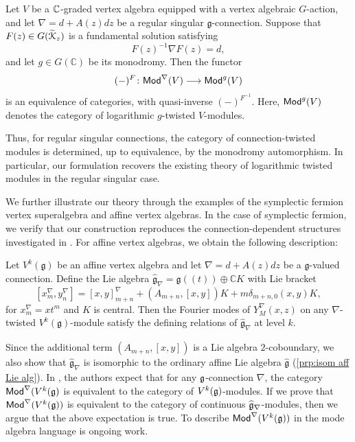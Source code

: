 \documentclass[final,reqno]{amsart}
\begin{document}
\begin{mainthm}
    Let $V$ be a $\mathbb{C}$-graded vertex algebra equipped with a vertex algebraic $G$-action, and let $\nabla=d+A(z)dz$ be a regular singular $\mathfrak{g}$-connection. Suppose that $F(z)\in G(\widetilde{\EuScript{K}}_z)$ is a fundamental solution satisfying
    \[
        F(z)^{-1}\nabla F(z)=d,
    \]
    and let $g\in G(\mathbb{C})$ be its monodromy. Then the functor
    \[
        (-)^F\colon\mathsf{Mod}^\nabla(V)\longrightarrow\mathsf{Mod}^g(V)
    \]
    is an equivalence of categories, with quasi-inverse $(-)^{F^{-1}}$. Here, $\mathsf{Mod}^g(V)$ denotes the category of logarithmic $g$-twisted $V$-modules.
\end{mainthm}
Thus, for regular singular connections, the category of connection-twisted modules is determined, up to equivalence, by the monodromy automorphism. In particular, our formulation recovers the existing theory of logarithmic twisted modules in the regular singular case.

We further illustrate our theory through the examples of the symplectic fermion vertex superalgebra and affine vertex algebras. In the case of symplectic fermion, we verify that our construction reproduces the connection-dependent structures investigated in \cite{FL25}. For affine vertex algebras, we obtain the following description:
\begin{mainthm}
    Let $V^k(\mathfrak{g})$ be an affine vertex algebra and let $\nabla=d+A(z)dz$ be a $\mathfrak{g}$-valued connection. Define the Lie algebra $\widehat{\mathfrak g}_\nabla=\mathfrak g((t))\oplus\mathbb CK$ with Lie bracket
\[
    [x_m^\nabla,y_n^\nabla]
    =[x,y]_{m+n}^\nabla
    +(A_{m+n},[x,y])K
    +m\delta_{m+n,0}(x,y)K,
\]
for $x_m^\nabla=xt^m$ and $K$ is central. Then the Fourier modes of $Y_M^\nabla(x,z)$ on any $\nabla$-twisted $V^k(\mathfrak{g})$-module satisfy the defining relations of $\widehat{\mathfrak g}_\nabla$ at level $k$.
\end{mainthm}

Since the additional term $(A_{m+n},[x,y])$ is a Lie algebra $2$-coboundary, we also show that $\widehat{\mathfrak g}_\nabla$ is isomorphic to the ordinary affine Lie algebra $\widehat{\mathfrak g}$ (\cref{prp:isom aff Lie alg}). In \cite{FL24}, the authors expect that for any $\mathfrak{g}$-connection $\nabla$, the category $\mathsf{Mod}^\nabla(V^k(\mathfrak{g})$ is equivalent to the category of $V^k(\mathfrak{g})$-modules. If we prove that $\mathsf{Mod}^\nabla(V^k(\mathfrak{g}))$ is equivalent to the category of continuous $\widehat{\mathfrak{g}}_\nabla$-modules, then we argue that the above expectation is true. To describe $\mathsf{Mod}^\nabla(V^k(\mathfrak{g}))$ in the mode algebra language is ongoing work.
\end{document}
